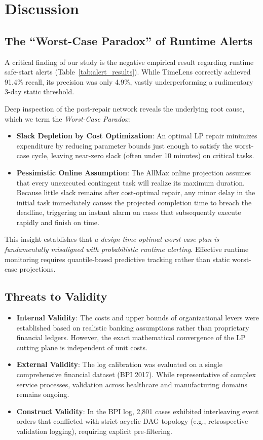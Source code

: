 \documentclass[conference]{IEEEtran}
\begin{document}
\section{Discussion}
\label{sec:discussion}

\subsection{The ``Worst-Case Paradox'' of Runtime Alerts}
A critical finding of our study is the negative empirical result regarding runtime safe-start alerts (Table~\ref{tab:alert_results}). While TimeLens correctly achieved 91.4\% recall, its precision was only 4.9\%, vastly underperforming a rudimentary 3-day static threshold. 

Deep inspection of the post-repair network reveals the underlying root cause, which we term the \textit{Worst-Case Paradox}:
\begin{itemize}
    \item \textbf{Slack Depletion by Cost Optimization}: An optimal LP repair minimizes expenditure by reducing parameter bounds just enough to satisfy the worst-case cycle, leaving near-zero slack (often under 10 minutes) on critical tasks.
    \item \textbf{Pessimistic Online Assumption}: The AllMax online projection assumes that every unexecuted contingent task will realize its maximum duration. Because little slack remains after cost-optimal repair, any minor delay in the initial task immediately causes the projected completion time to breach the deadline, triggering an instant alarm on cases that subsequently execute rapidly and finish on time.
\end{itemize}
This insight establishes that \textit{a design-time optimal worst-case plan is fundamentally misaligned with probabilistic runtime alerting}. Effective runtime monitoring requires quantile-based predictive tracking rather than static worst-case projections.

\subsection{Threats to Validity}
\begin{itemize}
    \item \textbf{Internal Validity}: The costs and upper bounds of organizational levers were established based on realistic banking assumptions rather than proprietary financial ledgers. However, the exact mathematical convergence of the LP cutting plane is independent of unit costs.
    \item \textbf{External Validity}: The log calibration was evaluated on a single comprehensive financial dataset (BPI 2017). While representative of complex service processes, validation across healthcare and manufacturing domains remains ongoing.
    \item \textbf{Construct Validity}: In the BPI log, 2,801 cases exhibited interleaving event orders that conflicted with strict acyclic DAG topology (e.g., retrospective validation logging), requiring explicit pre-filtering.
\end{itemize}
\end{document}
